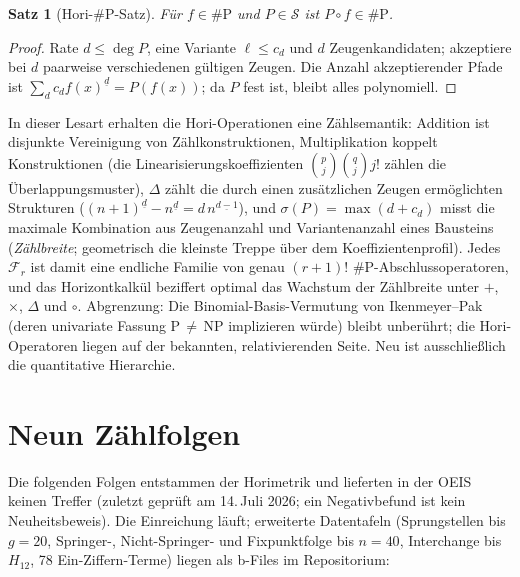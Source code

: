 \documentclass[11pt]{article}
\newtheorem{satz}{Satz}[section]
\theoremstyle{definition}
\theoremstyle{remark}
\newcommand{\Struk}{\mathcal S}
\begin{document}
\begin{satz}[Hori-\#P-Satz]\label{satz:sharpp}
Für $f\in\#\mathrm P$ und $P\in\Struk$ ist
$P\circ f\in\#\mathrm P$.
\end{satz}

\begin{proof}
Rate $d\le\deg P$, eine Variante $\ell\le c_d$ und $d$
Zeugenkandidaten; akzeptiere bei $d$ paarweise verschiedenen
gültigen Zeugen. Die Anzahl akzeptierender Pfade ist
$\sum_d c_d f(x)^{\underline d}=P(f(x))$; da $P$ fest ist, bleibt
alles polynomiell.
\end{proof}

In dieser Lesart erhalten die Hori-Operationen eine Zählsemantik:
Addition ist disjunkte Vereinigung von Zählkonstruktionen,
Multiplikation koppelt Konstruktionen (die
Linearisierungskoeffizienten $\binom pj\binom qj j!$ zählen die
Überlappungsmuster), $\Delta$ zählt die durch einen zusätzlichen
Zeugen ermöglichten Strukturen
($(n{+}1)^{\underline d}-n^{\underline d}=d\,n^{\underline{d-1}}$),
und $\sigma(P)=\max(d+c_d)$ misst die maximale Kombination aus
Zeugenanzahl und Variantenanzahl eines Bausteins
(\emph{Zählbreite}; geometrisch die kleinste Treppe über dem
Koeffizientenprofil). Jedes $\mathcal F_r$ ist damit eine endliche
Familie von genau $(r{+}1)!$ \#P-Abschlussoperatoren, und das
Horizontkalkül beziffert optimal das Wachstum der Zählbreite unter
$+$, $\times$, $\Delta$ und $\circ$. Abgrenzung: Die
Binomial-Basis-Vermutung von Ikenmeyer--Pak (deren univariate
Fassung P$\,\ne\,$NP implizieren würde) bleibt unberührt; die
Hori-Operatoren liegen auf der bekannten, relativierenden Seite.
Neu ist ausschließlich die quantitative Hierarchie.

\section{Neun Zählfolgen}

Die folgenden Folgen entstammen der Horimetrik und lieferten in der
OEIS keinen Treffer (zuletzt geprüft am 14.\,Juli 2026; ein
Negativbefund ist kein Neuheitsbeweis). Die Einreichung läuft;
erweiterte Datentafeln (Sprungstellen bis $g=20$, Springer-,
Nicht-Springer- und Fixpunktfolge bis $n=40$, Interchange bis
$H_{12}$, 78 Ein-Ziffern-Terme) liegen als b-Files im
Repositorium:
\end{document}
